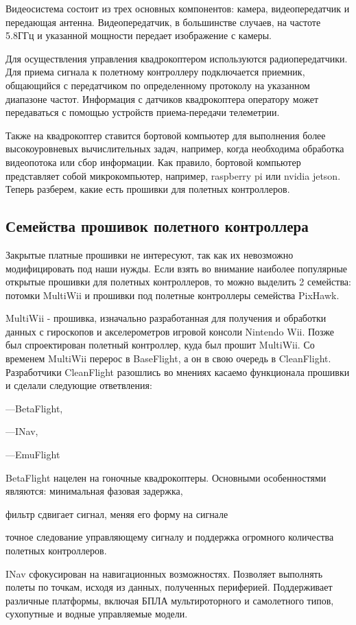Видеосистема состоит из трех основных компонентов: камера, видеопередатчик и передающая антенна. Видеопередатчик, в большинстве случаев, на частоте 5.8ГГц и указанной мощности передает изображение с камеры.

Для осуществления управления квадрокоптером используются радиопередатчики. Для приема сигнала к полетному контроллеру подключается приемник, общающийся с передатчиком по определенному протоколу на указанном диапазоне частот. Информация с датчиков квадрокоптера оператору может передаваться с помощью устройств приема-передачи телеметрии.

Также на квадрокоптер ставится бортовой компьютер для выполнения более высокоуровневых вычислительных задач, например, когда необходима обработка видеопотока или сбор информации. Как правило, бортовой компьютер представляет собой микрокомпьютер, например, raspberry pi или nvidia jetson. 
Теперь разберем, какие есть прошивки для полетных контроллеров.

\subsection{Семейства прошивок полетного контроллера}
Закрытые платные прошивки не интересуют, так как их невозможно модифицировать под наши нужды. Если взять во внимание наиболее популярные открытые прошивки для полетных контроллеров, то можно выделить 2 семейства: потомки MultiWii и прошивки под полетные контроллеры семейства PixHawk.

MultiWii - прошивка, изначально разработанная для получения и обработки данных с гироскопов и акселерометров игровой консоли Nintendo Wii. Позже был спроектирован полетный контроллер, куда был прошит MultiWii. Со временем MultiWii перерос в BaseFlight, а он в свою очередь в CleanFlight. Разработчики CleanFlight разошлись во мнениях касаемо функционала прошивки и сделали следующие ответвления:

---BetaFlight,

---INav,

---EmuFlight

BetaFlight нацелен на гоночные квадрокоптеры. Основными особенностями являются: минимальная фазовая задержка, 

фильтр сдвигает сигнал, меняя его форму
на сигнале


точное следование управляющему сигналу и поддержка огромного количества полетных контроллеров.

INav сфокусирован на навигационных возможностях. Позволяет выполнять полеты по точкам, исходя из данных, полученных периферией. Поддерживает различные платформы, включая БПЛА мультироторного и самолетного типов, сухопутные и водные управляемые модели.

